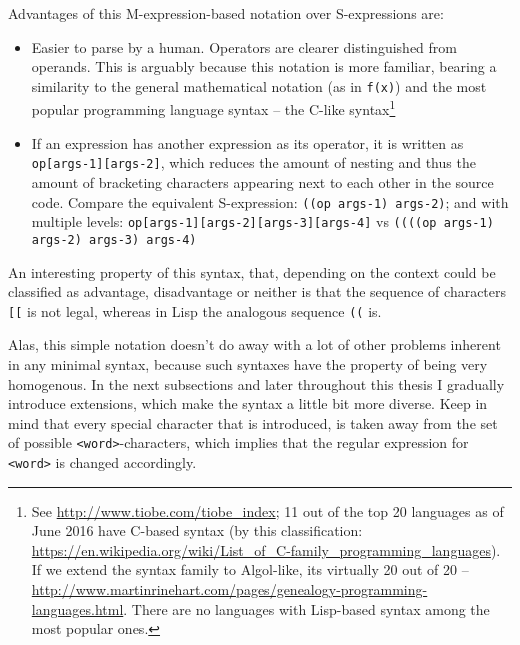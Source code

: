 Advantages of this M-expression-based notation over S-expressions are:
\begin{itemize}
    \item Easier to parse by a human. Operators are clearer distinguished from operands. This is arguably because this notation is more familiar, bearing a similarity to the general mathematical notation (as in \texttt{f(x)}) and the most popular programming language syntax -- the C-like syntax\footnote{See \url{http://www.tiobe.com/tiobe_index}; 11 out of the top 20 languages as of June 2016 have C-based syntax (by this classification: \url{https://en.wikipedia.org/wiki/List_of_C-family_programming_languages}). If we extend the syntax family to Algol-like, its virtually 20 out of 20 -- \url{http://www.martinrinehart.com/pages/genealogy-programming-languages.html}. There are no languages with Lisp-based syntax among the most popular ones.}
    \item If an expression has another expression as its operator, it is written as \texttt{op[args-1][args-2]}, which reduces the amount of nesting and thus the amount of bracketing characters appearing next to each other in the source code. Compare the equivalent S-expression: \texttt{((op args-1) args-2)}; and with multiple levels: \texttt{op[args-1][args-2][args-3][args-4]} vs \texttt{((((op args-1) args-2) args-3) args-4)}
\end{itemize}

An interesting property of this syntax, that, depending on the context could be classified as advantage, disadvantage or neither is that the sequence of characters \texttt{[[} is not legal, whereas in Lisp the analogous sequence \texttt{((} is.


Alas, this simple notation doesn't do away with a lot of other problems inherent in any minimal syntax, because such syntaxes have the property of being very homogenous. In the next subsections and later throughout this thesis I gradually introduce extensions, which make the syntax a little bit more diverse. Keep in mind that every special character that is introduced, is taken away from the set of possible \texttt{<word>}-characters, which implies that the regular expression for \texttt{<word>} is changed accordingly.

